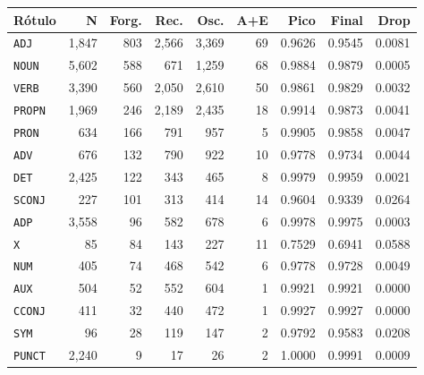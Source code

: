 \begin{table}[ht]
\begin{minipage}[t]{0.54\linewidth}
\end{minipage}
\hfill
\begin{minipage}[t]{0.42\linewidth}
\centering\tiny
\begin{tabular}{lrrrrrrrr}
\toprule
\textbf{Rótulo} & \textbf{N} & \textbf{Forg.} & \textbf{Rec.} & \textbf{Osc.} & \textbf{A+E} & \textbf{Pico} & \textbf{Final} & \textbf{Drop} \\
\midrule
\texttt{ADJ} & 1,847 & 803 & 2,566 & 3,369 & 69 & 0.9626 & 0.9545 & 0.0081 \\
\texttt{NOUN} & 5,602 & 588 & 671 & 1,259 & 68 & 0.9884 & 0.9879 & 0.0005 \\
\texttt{VERB} & 3,390 & 560 & 2,050 & 2,610 & 50 & 0.9861 & 0.9829 & 0.0032 \\
\texttt{PROPN} & 1,969 & 246 & 2,189 & 2,435 & 18 & 0.9914 & 0.9873 & 0.0041 \\
\texttt{PRON} & 634 & 166 & 791 & 957 & 5 & 0.9905 & 0.9858 & 0.0047 \\
\texttt{ADV} & 676 & 132 & 790 & 922 & 10 & 0.9778 & 0.9734 & 0.0044 \\
\texttt{DET} & 2,425 & 122 & 343 & 465 & 8 & 0.9979 & 0.9959 & 0.0021 \\
\texttt{SCONJ} & 227 & 101 & 313 & 414 & 14 & 0.9604 & 0.9339 & 0.0264 \\
\texttt{ADP} & 3,558 & 96 & 582 & 678 & 6 & 0.9978 & 0.9975 & 0.0003 \\
\texttt{X} & 85 & 84 & 143 & 227 & 11 & 0.7529 & 0.6941 & 0.0588 \\
\texttt{NUM} & 405 & 74 & 468 & 542 & 6 & 0.9778 & 0.9728 & 0.0049 \\
\texttt{AUX} & 504 & 52 & 552 & 604 & 1 & 0.9921 & 0.9921 & 0.0000 \\
\texttt{CCONJ} & 411 & 32 & 440 & 472 & 1 & 0.9927 & 0.9927 & 0.0000 \\
\texttt{SYM} & 96 & 28 & 119 & 147 & 2 & 0.9792 & 0.9583 & 0.0208 \\
\texttt{PUNCT} & 2,240 & 9 & 17 & 26 & 2 & 1.0000 & 0.9991 & 0.0009 \\
\bottomrule
\end{tabular}
\end{minipage}
\end{table}



